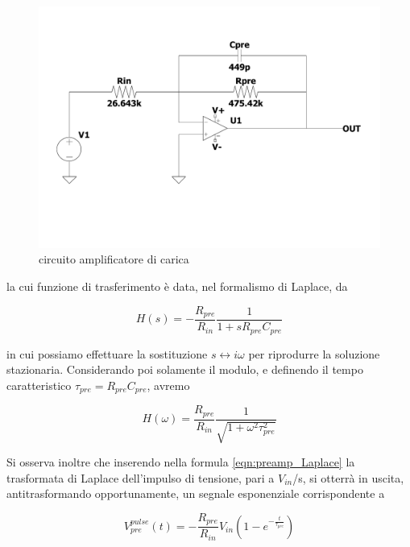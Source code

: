 \documentclass{article}
\begin{document}
\begin{center}
\begin{figure}[H]
\centering
\includegraphics[scale=0.3, angle=0]{preamp.pdf}
\caption{ circuito amplificatore di carica }
\label{fig:preamp}
\end{figure}
\end{center}

la cui funzione di trasferimento è data, nel formalismo di Laplace, da

\begin{equation}
    \label{eqn:preamp_Laplace}
    H(s) = -\frac{R_{pre}}{R_{in}} \frac{1}{1+sR_{pre}C_{pre}}
\end{equation}

in cui possiamo effettuare la sostituzione $s \longleftrightarrow i\omega$ per riprodurre la soluzione stazionaria. Considerando poi
solamente il modulo, e definendo il tempo caratteristico $\tau_{pre}=R_{pre}C_{pre}$, avremo

\begin{equation}
    \label{eqn:preamp_trasf}
    H(\omega) = \frac{R_{pre}}{R_{in}} \frac{1}{\sqrt{1+\omega^2\tau_{pre}^2}}
\end{equation}

Si osserva inoltre che inserendo nella formula \ref{eqn:preamp_Laplace} la trasformata di Laplace dell'impulso di tensione, pari a 
$V_{in}$/s, si otterrà in uscita, antitrasformando opportunamente, un segnale esponenziale corrispondente a

\begin{equation}
    \label{eqn:Vout1_preamp}
    V_{pre}^{pulse}(t) = -\frac{R_{pre}}{R_{in}}V_{in}(1-e^{-\frac{t}{\tau_{pre}}})
\end{equation}
\end{document}
